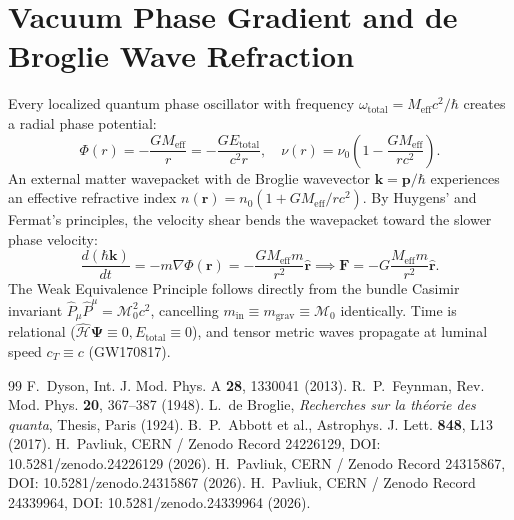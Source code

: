 \documentclass[11pt,a4paper]{article}
\begin{document}
\section{Vacuum Phase Gradient and de Broglie Wave Refraction}
Every localized quantum phase oscillator with frequency $\omega_{\text{total}} = M_{\text{eff}} c^2 / \hbar$ creates a radial phase potential:
\begin{equation}
\Phi(r) = - \frac{G M_{\text{eff}}}{r} = - \frac{G E_{\text{total}}}{c^2 r}, \quad \nu(r) = \nu_0 \left( 1 - \frac{G M_{\text{eff}}}{r c^2} \right).
\end{equation}
An external matter wavepacket with de Broglie wavevector $\mathbf{k} = \mathbf{p}/\hbar$ experiences an effective refractive index $n(\mathbf{r}) = n_0 (1 + G M_{\text{eff}} / rc^2)$. By Huygens' and Fermat's principles, the velocity shear bends the wavepacket toward the slower phase velocity:
\begin{equation}
\frac{d(\hbar \mathbf{k})}{dt} = - m \nabla \Phi(\mathbf{r}) = - \frac{G M_{\text{eff}} m}{r^2} \hat{\mathbf{r}} \implies \mathbf{F} = - G \frac{M_{\text{eff}} m}{r^2} \hat{\mathbf{r}}.
\end{equation}
The Weak Equivalence Principle follows directly from the bundle Casimir invariant $\hat{P}_\mu \hat{P}^\mu = \mathcal{M}_0^2 c^2$, cancelling $m_{\text{in}} \equiv m_{\text{grav}} \equiv \mathcal{M}_0$ identically. Time is relational ($\hat{\mathcal{H}}\mathbf{\Psi} \equiv 0, E_{\text{total}} \equiv 0$), and tensor metric waves propagate at luminal speed $c_T \equiv c$ (GW170817).

\begin{thebibliography}{99}
 F.~Dyson, Int. J. Mod. Phys. A \textbf{28}, 1330041 (2013).
 R.~P.~Feynman, Rev. Mod. Phys. \textbf{20}, 367--387 (1948).
 L.~de Broglie, \textit{Recherches sur la th\'eorie des quanta}, Thesis, Paris (1924).
 B.~P.~Abbott et al., Astrophys. J. Lett. \textbf{848}, L13 (2017).
 H.~Pavliuk, CERN / Zenodo Record 24226129, DOI: 10.5281/zenodo.24226129 (2026).
 H.~Pavliuk, CERN / Zenodo Record 24315867, DOI: 10.5281/zenodo.24315867 (2026).
 H.~Pavliuk, CERN / Zenodo Record 24339964, DOI: 10.5281/zenodo.24339964 (2026).
\end{thebibliography}
\end{document}
